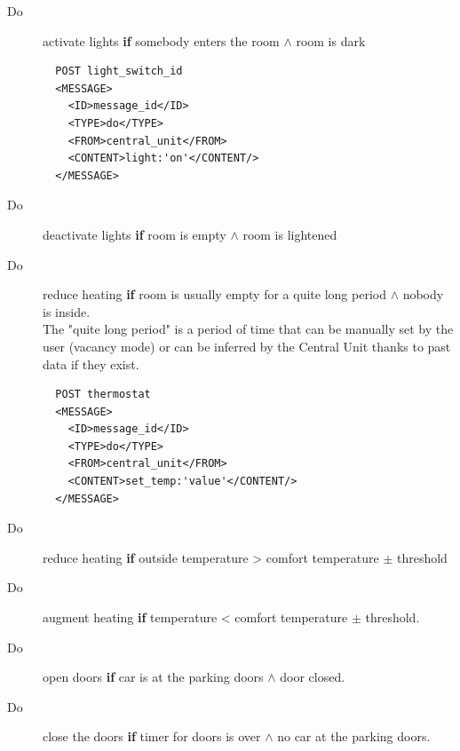 \documentclass{acm_proc_article-sp}
\begin{document}
\begin{description}
 \item[Do] activate lights \textbf{if} somebody enters the room $\land$ room is dark\\
 
\begin{minipage}{\linewidth}
\begin{lstlisting}
  POST light_switch_id 
  <MESSAGE>
    <ID>message_id</ID>
    <TYPE>do</TYPE>
    <FROM>central_unit</FROM>
    <CONTENT>light:'on'</CONTENT/>
  </MESSAGE> 
\end{lstlisting}
\end{minipage}

 \item[Do] deactivate lights \textbf{if} room is empty $\land$ room is lightened
 \item[Do] reduce heating \textbf{if} room is usually empty for a quite long period $\land$ nobody is inside.\\
 The "quite long period" is a period of time that can be manually set by the user (vacancy mode) or can be inferred by the Central Unit thanks to past data if they exist.
 
 \begin{minipage}{\linewidth}
\begin{lstlisting}
  POST thermostat 
  <MESSAGE>
    <ID>message_id</ID>
    <TYPE>do</TYPE>
    <FROM>central_unit</FROM>
    <CONTENT>set_temp:'value'</CONTENT/>
  </MESSAGE> 
\end{lstlisting}
\end{minipage}

 \item[Do] reduce heating \textbf{if} outside temperature > comfort temperature $\pm$ threshold
 \item[Do] augment heating \textbf{if} temperature < comfort temperature $\pm$ threshold.
 \item[Do] open doors \textbf{if} car is at the parking doors $\land$ door closed.
 \item[Do] close the doors \textbf{if} timer for doors is over $\land$ no car at the parking doors.\\
 

\end{description}
\end{document}
